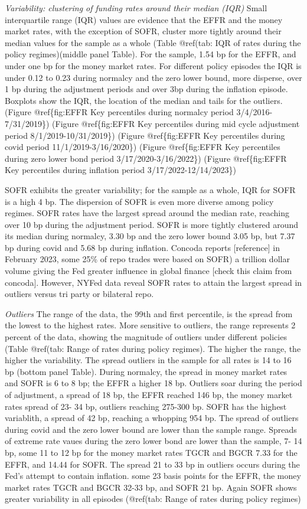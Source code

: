 \documentclass[
]{article}
\begin{document}
\emph{Variability: clustering of funding rates  around their median (IQR)}
Small interquartile range (IQR) values are evidence that the EFFR and the money market rates, with the exception of SOFR, cluster more tightly around their median values for the sample as a whole (Table @ref(tab: IQR of rates during the policy regimes)(middle panel Table). For the sample, 1.54 bp for the EFFR, and under one bp for the money market rates. For different policy episodes the IQR is under 0.12 to 0.23 during normalcy and the zero lower bound, more disperse, over 1 bp during the adjustment periods and over 3bp during the inflation episode. Boxplots show the IQR, the location of the median and tails for the outliers.
(Figure @ref\{fig:EFFR Key percentiles during normalcy period 3/4/2016-7/31/2019\})
(Figure @ref\{fig:EFFR Key percentiles during mid cycle adjustment period 8/1/2019-10/31/2019\})
(Figure @ref\{fig:EFFR Key percentiles during covid period 11/1/2019-3/16/2020\})
(Figure @ref\{fig:EFFR Key percentiles during zero lower bond period 3/17/2020-3/16/2022\})
(Figure @ref\{fig:EFFR Key percentiles during inflation period 3/17/2022-12/14/2023\})

SOFR exhibits the greater variability; for the sample as a whole, IQR for SOFR is a high 4 bp. The dispersion of SOFR is even more diverse among policy regimes. SOFR rates have the largest spread around the median rate, reaching over 10 bp during the adjustment period. SOFR is more tightly clustered around its median during normalcy, 3.30 bp and the zero lower bound 3.05 bp, but 7.37 bp during covid and 5.68 bp during inflation. Concoda reports {[}reference{]} in February 2023, some 25\% of repo trades were based on SOFR) a trillion dollar volume giving the Fed greater influence in global finance {[}check this claim from concoda{]}. However, NYFed data reveal SOFR rates to attain the largest spread in outliers versus tri party or bilateral repo.

\emph{Outliers}
The range of the data, the 99th and first percentile, is the spread from the lowest to the highest rates. More sensitive to outliers, the range represents 2 percent of the data, showing the magnitude of outliers under different policies (Table @ref(tab: Range of rates during policy regimes). The higher the range, the higher the variability. The spread outliers in the sample for all rates is 14 to 16 bp (bottom panel Table). During normalcy, the spread in money market rates and SOFR is 6 to 8 bp; the EFFR a higher 18 bp. Outliers soar during the period of adjustment, a spread of 18 bp, the EFFR reached 146 bp, the money market rates spread of 23- 34 bp, outliers reaching 275-300 bp. SOFR has the highest variablith, a spread of 42 bp, reaching a whopping 954 bp. The spread of outliers during covid and the zero lower bound are lower than the sample range. Spreads of extreme rate vaues during the zero lower bond are lower than the sample, 7- 14 bp, some 11 to 12 bp for the money market rates TGCR and BGCR 7.33 for the EFFR, and 14.44 for SOFR. The spread 21 to 33 bp in outliers occurs during the Fed's attempt to contain inflation. some 23 basis points for the EFFR, the money market rates TGCR and BGCR 32-33 bp, and SOFR 21 bp. Again SOFR shows greater variability in all episodes (@ref(tab: Range of rates during policy regimes)
\end{document}
